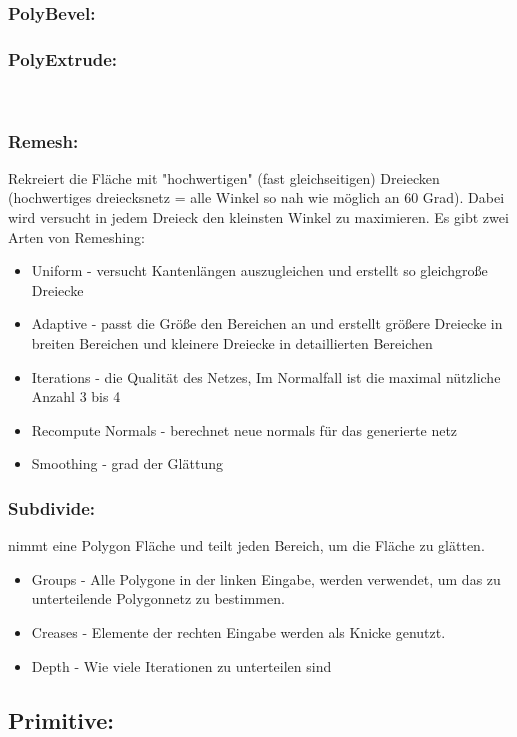 \subsubsection*{​PolyBevel:}
\subsubsection*{​PolyExtrude:}​
\subsubsection*{​Remesh:}
Rekreiert die Fläche mit "hochwertigen" (fast gleichseitigen) Dreiecken (hochwertiges dreiecksnetz = alle Winkel so nah wie möglich an 60 Grad). Dabei wird versucht in jedem Dreieck den kleinsten Winkel zu maximieren.
Es gibt zwei Arten von Remeshing:
\begin{itemize}
\item Uniform - versucht Kantenlängen auszugleichen und erstellt so gleichgroße Dreiecke
\item Adaptive - passt die Größe den Bereichen an und erstellt größere Dreiecke in breiten Bereichen und kleinere Dreiecke in detaillierten Bereichen
\end{itemize}
\begin{itemize}
\item Iterations - die Qualität des Netzes, Im Normalfall ist die maximal nützliche Anzahl 3 bis 4
\item Recompute Normals - berechnet neue normals für das generierte netz
\item Smoothing - grad der Glättung
\end{itemize}

\subsubsection*{​Subdivide:}
nimmt eine Polygon Fläche und teilt jeden Bereich, um die Fläche zu glätten.
\begin{itemize}
\item Groups - Alle Polygone in der linken Eingabe, werden verwendet, um das zu unterteilende Polygonnetz zu bestimmen.
\item Creases - Elemente der rechten Eingabe werden als Knicke genutzt.
\item Depth - Wie viele Iterationen zu unterteilen sind
\end{itemize}

\subsection*{​Primitive:}
